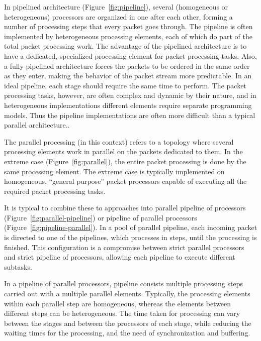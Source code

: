 In pipelined architecture (Figure~\ref{fig:pipeline}), several (homogeneous or heterogeneous) processors are organized in one after each other, forming a number of processing steps that every packet goes through. The pipeline is often implemented by heterogeneous processing elements, each of which do part of the total packet processing work. The advantage of the pipelined architecture is to have a dedicated, specialized processing element for packet processing tasks. Also, a fully pipelined architecture forces the packets to be ordered in the same order as they enter, making the behavior of the packet stream more predictable. In an ideal pipeline, each stage should require the same time to perform. The packet processing tasks, however, are often complex and dynamic by their nature, and in heterogeneous implementations different elements require separate programming models. Thus the pipeline implementations are often more difficult than a typical parallel architecture..~\cite{Giladi:2008:Network}

The parallel processing (in this context) refers to a topology where several processing elements work in parallel on the packets dedicated to them. In the extreme case (Figure~\ref{fig:parallel}), the entire packet processing is done by the same processing element. The extreme case is typically implemented on homogeneous, ``general purpose'' packet processors capable of executing all the required packet processing tasks.~\cite{Giladi:2008:Network}

It is typical to combine these to approaches into parallel pipeline of processors (Figure~\ref{fig:parallel-pipeline}) or pipeline of parallel processors (Figure~\ref{fig:pipeline-parallel}). In a pool of parallel pipeline, each incoming packet is directed to one of the pipelines, which processes in steps, until the processing is finished. This configuration is a compromise between strict parallel processors and strict pipeline of processors, allowing each pipeline to execute different subtasks.~\cite{Giladi:2008:Network}

In a pipeline of parallel processors, pipeline consists multiple processing steps carried out with a multiple parallel elements. Typically, the processing elements within each parallel step are homogeneous, whereas the elements between different steps can be heterogeneous. The time taken for processing can vary between the stages and between the processors of each stage, while reducing the waiting times for the processing, and the need of synchronization and buffering.~\cite{Giladi:2008:Network}

